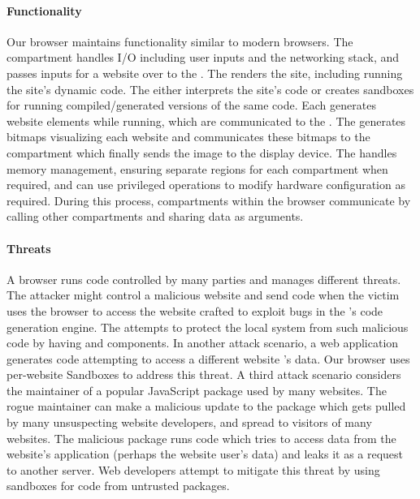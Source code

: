 \paragraph{Functionality}
Our browser maintains functionality similar to modern browsers.
The \local compartment handles I/O including user inputs and the networking stack, 
and passes inputs for a website over to the \renderer.
The \renderer renders the site, including running the site's dynamic code.
The \renderer either interprets the site's code or creates sandboxes
for running compiled/generated versions of the same code.
Each \sandbox generates website elements while running, which are communicated
to the \renderer. 
The \renderer generates bitmaps visualizing each website and communicates
these bitmaps to the \local compartment which finally sends the image to
the display device.
The \manager handles memory management, ensuring separate regions for 
each compartment when required, and can use privileged operations to
modify hardware configuration as required.
During this process, compartments within the browser communicate by 
calling other compartments and sharing data as arguments.

\paragraph{Threats}
A browser runs code controlled by many parties and manages different threats.
The attacker might control a malicious website and send code when the 
victim uses the browser to access the website crafted to exploit bugs in the
\renderer's code generation engine.
The \browser attempts to protect the local system from such malicious code by
having \renderer and \local components. 
In another attack scenario, a web application generates code attempting to access
a different website \sandbox's data.
Our browser uses per-website Sandboxes to address this threat.
A third attack scenario considers the maintainer of a popular JavaScript package
used by many websites.
The rogue maintainer can make a malicious update to the package which gets
pulled by many unsuspecting website developers, and spread to visitors of many
websites.
The malicious package runs code which tries to access data from the website's
application (perhaps the website user's data) and leaks it as a request to 
another server.
Web developers attempt to mitigate this threat by using \nested sandboxes
for code from untrusted packages.

